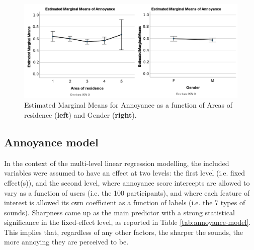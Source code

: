 \begin{figure}[h]
  \centering
  \includegraphics[width=\textwidth]{Figures/orga_anovas.png}
  \caption{Estimated Marginal Means for Annoyance as a function of Areas of residence (\textbf{left}) and Gender (\textbf{right}). \label{fig:anova}
}
\end{figure}

\subsection{Annoyance model}
In the context of the multi-level linear regression modelling, the included variables were assumed to have an effect at two levels: the first level (i.e. fixed effect(s)), and the second level, where annoyance score intercepts are allowed to vary as a function of users (i.e. the 100 participants), and where each feature of interest is allowed its own coefficient as a function of labels (i.e. the 7 types of sounds). Sharpness came up as the main predictor with a strong statistical significance in the fixed-effect level, as reported in Table \ref{tab:annoyance-model}. This implies that, regardless of any other factors, the sharper the sounds, the more annoying they are perceived to be.

